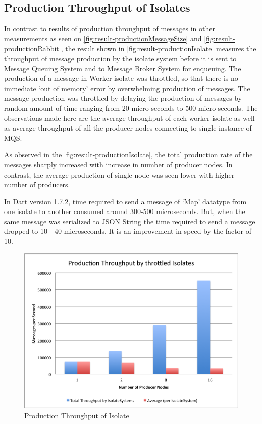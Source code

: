 \subsection{Production Throughput of Isolates}
  In contrast to results of production throughput of messages in other measurements as seen on \autoref{fig:result-productionMessageSize} and \autoref{fig:result-productionRabbit}, the result shown in
 \autoref{fig:result-productionIsolate} measures the throughput of message production by the isolate system before it is sent to Message Queuing System and to Message Broker System for enqueuing. The production of a message in Worker isolate was throttled, so that there is no immediate ‘out of memory’ error by overwhelming production of messages. The message production was throttled by delaying the production of messages by random amount of time ranging from 20 micro seconds to 500 micro seconds. The observations made here are the average throughput of each worker isolate as well as average throughput of all the producer nodes connecting to single instance of MQS.

  As observed in the \autoref{fig:result-productionIsolate}, the total production rate of the messages sharply increased with increase in number of producer nodes. In contrast, the average production of single node was seen lower with higher number of producers.

  In Dart version 1.7.2, time required to send a message of ‘Map’ datatype from one isolate to another consumed around 300-500 microseconds. But, when the same message was serialized to JSON String the time required to send a message dropped to 10 - 40 microseconds. It is an improvement in speed by the factor of 10.

\begin{figure}[H]
  \centering
  \includegraphics[width=1\textwidth]{figures/06productionIsolate}
  \caption[Production Throughput of Isolate]{Production Throughput of Isolate}
  \label{fig:result-productionIsolate}
\end{figure}

